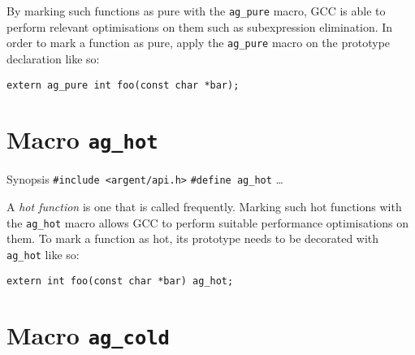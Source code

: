   By marking such functions as pure with the \texttt{ag\_pure} macro, GCC is able
  to perform relevant optimisations on them such as subexpression elimination. In
  order to mark a function as pure, apply the \texttt{ag\_pure} macro on the
  prototype declaration like so:

  \begin{lstlisting}[linewidth=1.0\linewidth, caption=Example use of ag\_pure]
    extern ag_pure int foo(const char *bar);
  \end{lstlisting}

  \begin{algorithmic}
    \Else
    \EndIf
  \end{algorithmic}


%


\section{Macro \texttt{ag\_hot}}

\begin{bclogo}[logo=\bccrayon, noborder=true, barre=snake, couleurBarre=gray]
    {Synopsis}
  \verb|#include <argent/api.h>|
  \verb|#define ag_hot| \ldots
\end{bclogo}

A \emph{hot function} is one that is called frequently. Marking such hot
functions with the \verb|ag_hot| macro allows GCC to perform suitable
performance optimisations on them. To mark a function as hot, its prototype
needs to be decorated with \verb|ag_hot| like so:

\begin{lstlisting}[linewidth=1.0\linewidth, 
    caption=Example use of ag\_hot]
extern int foo(const char *bar) ag_hot;
\end{lstlisting}


%


\section{Macro \texttt{ag\_cold}}

